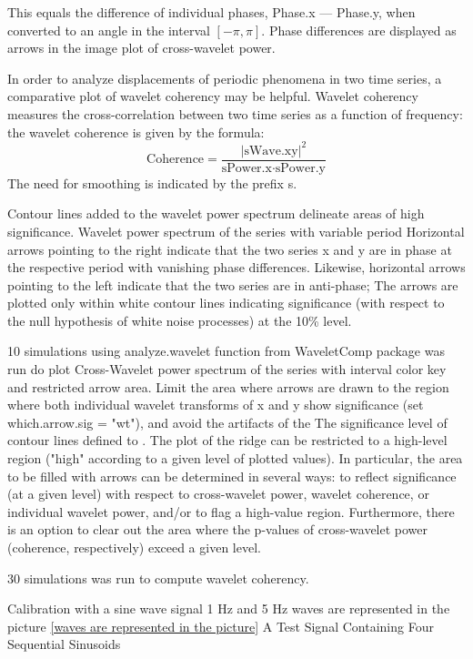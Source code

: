 \documentclass{biophys-new}
\begin{document}
This equals the difference of individual phases, Phase.x --- Phase.y, when converted to an angle in the
interval $[-\pi,\pi]$.
Phase differences are displayed as arrows in the image plot of cross-wavelet power.

In order to analyze displacements of periodic phenomena in two time series, a comparative plot of wavelet coherency may be helpful.
Wavelet coherency  measures the cross-correlation between two time series as a function of frequency: the wavelet coherence is given by the formula:
\begin{equation}\label{eq:coherence}
\text{Coherence}=\frac{|\text{sWave.xy}|^2}{\text{sPower.x}\cdot\text{sPower.y}}
\end{equation}
The need for smoothing is indicated by the prefix s.


Contour lines added to the wavelet power spectrum delineate areas of high significance.
Wavelet power spectrum of the series with variable period
Horizontal arrows pointing to the right indicate that the two series x and y are in phase at the respective period with vanishing phase differences.
Likewise, horizontal arrows pointing to the left indicate that the two series are in anti-phase;
The arrows are plotted only within white contour lines indicating significance (with respect to the null hypothesis of white noise processes) at the 10\% level.

10 simulations using analyze.wavelet function from WaveletComp package was run do plot Cross-Wavelet power spectrum of the series with interval color key and restricted arrow area.
Limit the area where arrows are drawn to the region where both individual wavelet transforms of x and y show significance (set which.arrow.sig = "wt"), and avoid the artifacts of the
The significance level of contour lines defined to . The plot of the ridge can be restricted to a high-level region ("high" according to a given level of plotted values). In particular, the area to be filled with arrows can be determined in several ways: to reflect significance (at a given level) with respect to cross-wavelet power, wavelet coherence, or individual wavelet power, and/or to flag a high-value region. Furthermore, there is an option to clear out the area where the p-values of cross-wavelet power (coherence, respectively) exceed a given level.

30 simulations was run to compute wavelet coherency.

Calibration with a sine wave signal
1 Hz and 5 Hz waves are represented in the picture \ref{waves are represented in the picture}
A Test Signal Containing Four Sequential Sinusoids
\end{document}

